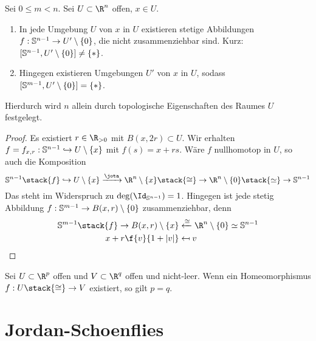 \begin{st}
	Sei $0 \le m < n$.
	Sei $U \subset \R^n$ offen, $x \in U$.
	\begin{enumerate}[(1)]
		\item
			In jede Umgebung $U$ von $x$ in $U$ existieren stetige Abbildungen $f: \S^{n-1} \to U' \setminus \{0\}$, die nicht zusammenziehbar sind.
			Kurz: $[\S^{n-1}, U' \setminus \{0\}] \neq \{*\}$.
		\item
			Hingegen existieren Umgebungen $U'$ von $x$ in $U$, sodass $[\S^{m-1}, U' \setminus \{0\}] = \{*\}$.
	\end{enumerate}
	Hierdurch wird $n$ allein durch topologische Eigenschaften des Raumes $U$ festgelegt.
	\begin{proof}
		Es existiert $r \in \R_{>0}$ mit $B(x, 2r) \subset U$.
		Wir erhalten $f = f_{x,r} : \S^{n-1} \injto U \setminus \{x\}$ mit $f(s) = x + rs$.
		Wäre $f$ nullhomotop in $U$, so auch die Komposition
		\[
			\S^{n-1} \stack{f}\injto U \setminus \{x\} \xrightarrow{\jota} \R^n \setminus \{x\} \stack{\homeomorphic}\to \R^n \setminus \{0\} \stack{\homotopic}\to \S^{n-1}
		\]
		Das steht im Widerspruch zu $\deg(\Id_{\S^{n-1}}) = 1$.
		Hingegen ist jede stetig Abbildung $f: \S^{m-1} \to B(x, r) \setminus \{0\}$ zusammenziehbar, denn
		\begin{align*}
			\S^{m-1} \stack{f}\to B(x,r) \setminus \{x\} & \xleftarrow{\homeomorphic} \R^n \setminus \{0\} \homotopic \S^{n-1} \\
			x + r \f {v}{1+|v|} & \mapsfrom v
		\end{align*}
	\end{proof}
\end{st}

\begin{st}
	Sei $U \subset \R^p$ offen und $V \subset \R^q$ offen und nicht-leer.
	Wenn ein Homeomorphismus $f: U \stack{\homeomorphic}\to V$ existiert, so gilt $p = q$.
\end{st}


\section{Jordan-Schoenflies}

